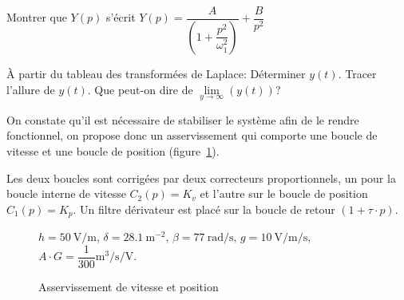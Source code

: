\begin{Exo}[name={Devoir},title={Système de pendulation},origin={Adapté de Centrale MP 2000},label={exo:CentralePendulation}]
\Acompleter[8]


\qst Montrer que $Y(p)$  s'écrit $Y(p)=\dfrac{A}{ \left(1+\dfrac{p^2}{\omega_1^2}\right)} +\dfrac{B}{p^2}$

\Acompleter[8]



\qst À partir du tableau des transformées de Laplace:
\sq Déterminer $y(t)$.  
\sq Tracer l'allure de $y(t)$.
\sq Que peut-on dire de $\lim\limits_{y\to\infty}(y(t))$?

\Acompleter[12]




On constate qu'il est nécessaire de stabiliser le système afin de le rendre fonctionnel, on propose donc un asservissement qui comporte une boucle de vitesse et une boucle de position (figure~\ref{fig:trainPendulaire-3}).

Les deux boucles sont corrigées par deux correcteurs proportionnels, un pour la boucle interne de vitesse $C_2(p)=K_v$  et l'autre sur le boucle de position $C_1(p)=K_p$.  Un filtre dérivateur est placé sur la boucle de retour $(1+\tau\cdot p)$.


\begin{figure}[!htb]
\centering
{\smaller
{}\par
}

 $h=\SI{50}{\volt\per\metre}$, $\delta=\SI{28.1}{\metre\tothe{-2}}$, $\beta=\SI{77}{\radian\per\second}$, $g=\SI{10}{\volt\per\metre\per\second}$, $A\cdot G=\dfrac{1}{300}\si{\metre\tothe{3}\per\second\per\volt}$.
\caption{Asservissement de vitesse et position}
\label{fig:trainPendulaire-3}
\end{figure}


\end{Exo}
